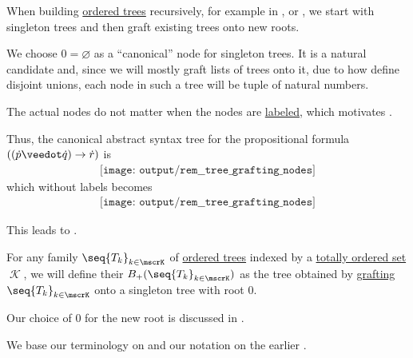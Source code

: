 \begin{remark}\label{rem:tree_grafting_nodes}
  When building \hyperref[def:ordered_tree]{ordered trees} recursively, for example in ,  or , we start with singleton trees and then graft existing trees onto new roots.

  We choose \( 0 = \varnothing \) as a \enquote{canonical} node for singleton trees. It is a natural candidate and, since we will mostly graft lists of trees onto it, due to how define disjoint unions, each node in such a tree will be tuple of natural numbers.

  The actual nodes do not matter when the nodes are \hyperref[def:labeled_set]{labeled}, which motivates .

  Thus, the canonical abstract syntax tree for the propositional formula \( ((\synp \synvee \synq) \rightarrow \syn r) \) is
  \begin{equation*}
    \begin{aligned}
      \texttt{[image: output/rem\_\_tree\_grafting\_nodes]}
    \end{aligned}
  \end{equation*}
  which without labels becomes
  \begin{equation*}
    \begin{aligned}
      \texttt{[image: output/rem\_\_tree\_grafting\_nodes]}
    \end{aligned}
  \end{equation*}

  This leads to .
\end{remark}

\begin{definition}\label{def:ordered_tree_grafting_product}\mimprovised
  For any family \( \seq{ T_k }_{k \in \mscrK} \) of \hyperref[def:ordered_tree]{ordered trees} indexed by a \hyperref[def:totally_ordered_set]{totally ordered set} \( \mscrK \), we will define their  \( B_+(\seq{ T_k }_{k \in \mscrK}) \) as the tree obtained by \hyperref[def:labeled_tree_grafting]{grafting} \( \seq{ T_k }_{k \in \mscrK} \) onto a singleton tree with root \( 0 \).
\end{definition}
\begin{comments}
  \item Our choice of \( 0 \) for the new root is discussed in .

  \item We base our terminology on \cite[\S 3.6]{Holtkamp2011RootedTrees} and our notation on the earlier \cite[9]{Hoffman2003RootedTrees}.
\end{comments}

